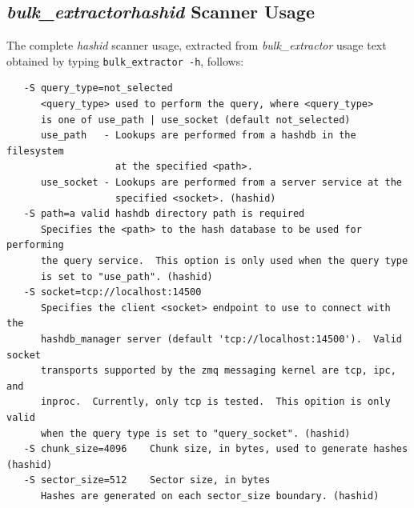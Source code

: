 \documentclass[11pt,twoside]{article}
\newcommand \bulk {\textit{bulk\_extractor}\xspace}
\newcommand \hid {\textit{hashid}\xspace}
\begin{document}
\subsection{\bulk \hid Scanner Usage\label{hid-usage}}
The complete \hid scanner usage,
extracted from \bulk usage text obtained
by typing \texttt{bulk\_extractor -h}, follows:
\begin{small}
\begin{verbatim}
   -S query_type=not_selected    
      <query_type> used to perform the query, where <query_type>
      is one of use_path | use_socket (default not_selected)
      use_path   - Lookups are performed from a hashdb in the filesystem
                   at the specified <path>.
      use_socket - Lookups are performed from a server service at the
                   specified <socket>. (hashid)
   -S path=a valid hashdb directory path is required    
      Specifies the <path> to the hash database to be used for performing
      the query service.  This option is only used when the query type
      is set to "use_path". (hashid)
   -S socket=tcp://localhost:14500    
      Specifies the client <socket> endpoint to use to connect with the
      hashdb_manager server (default 'tcp://localhost:14500').  Valid socket
      transports supported by the zmq messaging kernel are tcp, ipc, and
      inproc.  Currently, only tcp is tested.  This opition is only valid
      when the query type is set to "query_socket". (hashid)
   -S chunk_size=4096    Chunk size, in bytes, used to generate hashes (hashid)
   -S sector_size=512    Sector size, in bytes
      Hashes are generated on each sector_size boundary. (hashid)
\end{verbatim}
\end{small}
\end{document}
